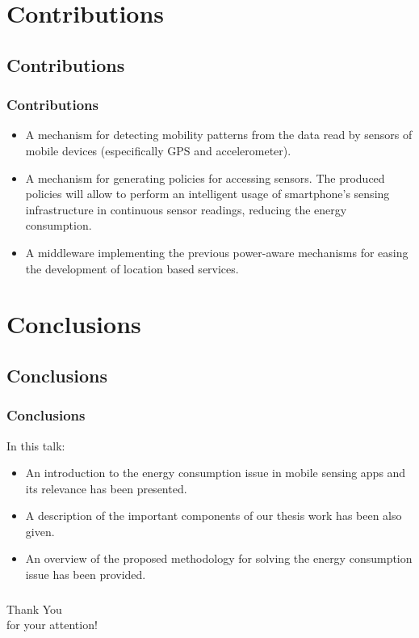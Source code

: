 \documentclass[compress,9pt,xcolor={dvipsnames,table}]{beamer}
\begin{document}
\section{Contributions}
\subsection{Contributions}
\begin{frame}\frametitle{Contributions}
\begin{itemize}
  \item A mechanism for detecting mobility patterns from the data read by sensors of mobile devices (especifically GPS and accelerometer).
  \item A mechanism for generating policies for accessing sensors.
  The produced policies will allow to perform an intelligent usage of smartphone's sensing infrastructure in continuous sensor readings, reducing the energy consumption.
  \item A middleware implementing the previous power-aware mechanisms for easing the development of location based services.
\end{itemize}
\end{frame}

\section{Conclusions}
\subsection{Conclusions}
\begin{frame}\frametitle{Conclusions}
In this talk:
\begin{itemize}
  \item An introduction to the energy consumption issue in mobile sensing apps and its relevance has been presented.
  \item A description of the important components of our thesis work has been also given.
  \item An overview of the proposed methodology for solving the energy consumption issue has been provided.
\end{itemize}
\end{frame}

\begin{frame}\frametitle{}
\begin{center}
{
\Huge
Thank You\\ for your attention!
}
\end{center}

\end{frame}
\end{document}
